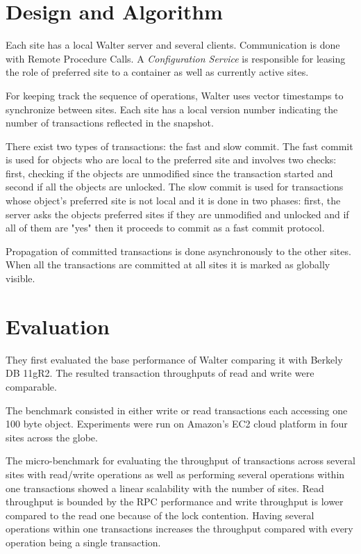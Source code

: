 \documentclass[a4paper]{article}
\begin{document}
\section{Design and Algorithm}

Each site has a local Walter server and several clients. Communication is done with Remote Procedure Calls. A \textit{Configuration Service} is responsible for leasing the role of preferred site to a container as well as currently active sites. 

For keeping track the sequence of operations, Walter uses vector timestamps to synchronize between sites. Each site has a local version number indicating the number of transactions reflected in the snapshot.

There exist two types of transactions: the fast and slow commit. The fast commit is used for objects who are local to the preferred site and involves two checks: first, checking if the objects are unmodified since the transaction started and second if all the objects are unlocked. The slow commit is used for transactions whose object's preferred site is not local and it is done in two phases: first, the server asks the objects preferred sites if they are unmodified and unlocked and if all of them are "yes" then it proceeds to commit as a fast commit protocol.

Propagation of committed transactions is done asynchronously to the other sites. When all the transactions are committed at all sites it is marked as globally visible. 

\section{Evaluation}

They first evaluated the base performance of Walter comparing it with Berkely DB 11gR2. The resulted transaction throughputs of read and write were comparable.

The benchmark consisted in either write or read transactions each accessing one 100 byte object. Experiments were run on Amazon's EC2 cloud platform in four sites across the globe. 

The micro-benchmark for evaluating the throughput of transactions across several sites with read/write operations as well as performing several operations within one transactions showed a linear scalability with the number of sites. Read throughput is bounded by the RPC performance and write throughput is lower compared to the read one because of the lock contention. Having several operations within one transactions increases the throughput compared with every operation being a single transaction. 
\end{document}
